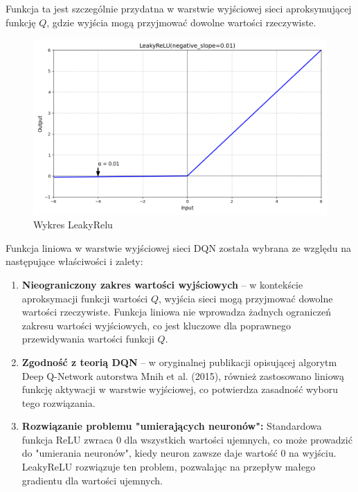 \documentclass[a4paper,12pt]{article}
\begin{document}
Funkcja ta jest szczególnie przydatna w warstwie wyjściowej sieci aproksymującej funkcję \(Q\), gdzie wyjścia mogą przyjmować dowolne wartości rzeczywiste.

\begin{figure}[H]
    \centering
    \includegraphics[width=1\linewidth]{LeakyRelu.png}
    \caption{Wykres LeakyRelu}
\end{figure}

Funkcja liniowa w warstwie wyjściowej sieci DQN została wybrana ze względu na następujące właściwości i zalety:

\begin{enumerate}[label=\textbf{\arabic*.}, leftmargin=1.5cm]
    \item \textbf{Nieograniczony zakres wartości wyjściowych} – w kontekście aproksymacji funkcji wartości \(Q\), wyjścia sieci mogą przyjmować dowolne wartości rzeczywiste. Funkcja liniowa nie wprowadza żadnych ograniczeń zakresu wartości wyjściowych, co jest kluczowe dla poprawnego przewidywania wartości funkcji \(Q\).

    \item \textbf{Zgodność z teorią DQN} – w oryginalnej publikacji opisującej algorytm Deep Q-Network autorstwa Mnih et al. (2015), również zastosowano liniową funkcję aktywacji w warstwie wyjściowej, co potwierdza zasadność wyboru tego rozwiązania.

    \item \textbf{Rozwiązanie problemu "umierających neuronów":} Standardowa funkcja ReLU zwraca 0 dla wszystkich wartości ujemnych, co może prowadzić do "umierania neuronów", kiedy neuron zawsze daje wartość 0 na wyjściu. LeakyReLU rozwiązuje ten problem, pozwalając na przepływ małego gradientu dla wartości ujemnych.
\end{enumerate}
\end{document}
